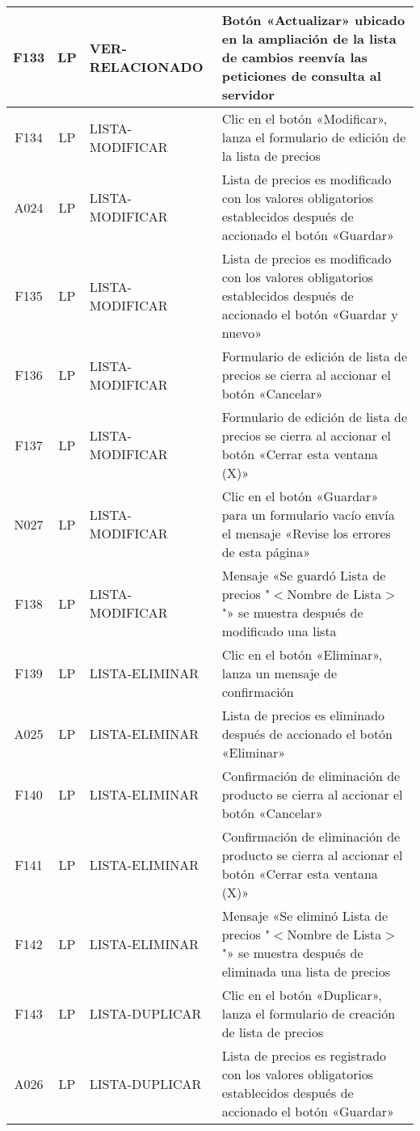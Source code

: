 \begin{landscape}
{\begin{longtable}[htb]{|c|c|p{5.0cm}|p{14.0cm}|}
F133 & LP & VER-RELACIONADO & Botón «Actualizar» ubicado en la ampliación de la lista de cambios reenvía las peticiones de consulta al servidor \\ \hline
F134 & LP & LISTA-MODIFICAR & Clic en el botón «Modificar», lanza el formulario de edición de la lista de precios \\ \hline
A024 & LP & LISTA-MODIFICAR & Lista de precios es modificado con los valores obligatorios establecidos después de accionado el botón «Guardar» \\ \hline
F135 & LP & LISTA-MODIFICAR & Lista de precios es modificado con los valores obligatorios establecidos después de accionado el botón «Guardar y nuevo» \\ \hline
F136 & LP & LISTA-MODIFICAR & Formulario de edición de lista de precios se cierra al accionar el botón «Cancelar» \\ \hline
F137 & LP & LISTA-MODIFICAR & Formulario de edición de lista de precios se cierra al accionar el botón «Cerrar esta ventana (X)» \\ \hline
N027 & LP & LISTA-MODIFICAR & Clic en el botón «Guardar» para un formulario vacío envía el mensaje «Revise los errores de esta página» \\ \hline
F138 & LP & LISTA-MODIFICAR & Mensaje «Se guardó Lista de precios "$<$Nombre de Lista$>$"» se muestra después de modificado una lista \\ \hline
F139 & LP & LISTA-ELIMINAR & Clic en el botón «Eliminar», lanza un mensaje de confirmación \\ \hline
A025 & LP & LISTA-ELIMINAR & Lista de precios es eliminado después de accionado el botón «Eliminar» \\ \hline
F140 & LP & LISTA-ELIMINAR & Confirmación de eliminación de producto se cierra al accionar el botón «Cancelar» \\ \hline
F141 & LP & LISTA-ELIMINAR & Confirmación de eliminación de producto se cierra al accionar el botón «Cerrar esta ventana (X)» \\ \hline
F142 & LP & LISTA-ELIMINAR & Mensaje «Se eliminó Lista de precios "$<$Nombre de Lista$>$"» se muestra después de eliminada una lista de precios \\ \hline
F143 & LP & LISTA-DUPLICAR & Clic en el botón «Duplicar», lanza el formulario de creación de lista de precios \\ \hline
A026 & LP & LISTA-DUPLICAR & Lista de precios es registrado con los valores obligatorios establecidos después de accionado el botón «Guardar» \\ \hline

\end{longtable}}
\end{landscape}
